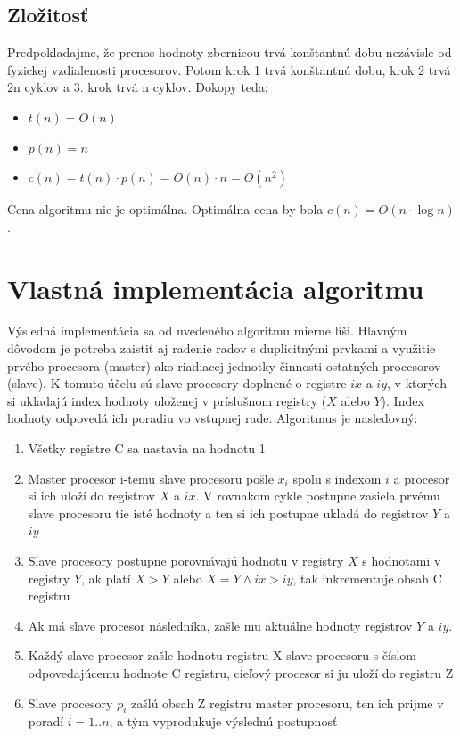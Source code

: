 \documentclass[a4paper,11pt]{article}
\begin{document}
\subsection{Zložitosť}
Predpokladajme, že prenos hodnoty zbernicou trvá konštantnú dobu nezávisle od fyzickej vzdialenosti procesorov. Potom krok 1 trvá konštantnú dobu, krok 2 trvá 2n cyklov a 3. krok trvá n cyklov. Dokopy teda:
\begin{itemize}
\item $ t(n) = O(n) $
\item $ p(n) = n $
\item $ c(n) = t(n) \cdot p(n) = O(n)\cdot n = O(n^2) $
\end{itemize}
Cena algoritmu nie je optimálna. Optimálna cena by bola $ c(n) = O(n \cdot \log n) $.

\section{Vlastná implementácia algoritmu}
Výsledná implementácia sa od uvedeného algoritmu mierne líši. Hlavným dôvodom je potreba zaistiť aj radenie radov s duplicitnými prvkami a využitie prvého procesora (master) ako riadiacej jednotky činnosti ostatných procesorov (slave). K tomuto účelu sú slave procesory doplnené o registre $ix$ a $iy$, v ktorých si ukladajú index hodnoty uloženej v príslušnom registry ($X$ alebo $Y$). Index hodnoty odpovedá ich poradiu vo vstupnej rade. Algoritmus je nasledovný:
\begin{enumerate}
\item Všetky registre C sa nastavia na hodnotu 1
\item Master procesor i-temu slave procesoru pošle $x_i$ spolu s indexom $i$ a procesor si ich uloží do registrov $X$ a $ix$. V rovnakom cykle postupne zasiela prvému slave procesoru tie isté hodnoty a ten si ich postupne ukladá do registrov $Y$ a $iy$
\item Slave procesory postupne porovnávajú hodnotu v registry $X$ s hodnotami v registry $Y$, ak platí $X > Y$ alebo $X = Y \wedge ix > iy$, tak inkrementuje obsah C registru
\item Ak má slave procesor následníka, zašle mu aktuálne hodnoty registrov $Y$ a $iy$.
\item Každý slave procesor zašle hodnotu registru X slave procesoru s číslom odpovedajúcemu hodnote C registru, cieľový procesor si ju uloží do registru Z
\item Slave procesory $p_i$ zašlú obsah Z registru master procesoru, ten ich prijme v poradí $i = 1..n$, a tým vyprodukuje výslednú postupnosť
\end{enumerate}
\end{document}
